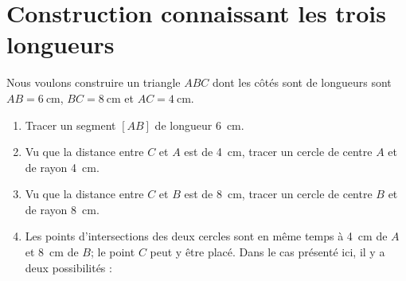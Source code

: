 


\section{Construction connaissant les trois longueurs}

Nous voulons construire un triangle \(ABC\) dont les côtés sont de longueurs sont \( AB=\SI{6}{\centi\meter}\), \( BC=\SI{8}{\centi\meter}\) et \( AC=\SI{4}{\centi\meter}\).


\vspace{2cm}

\begin{enumerate}
    \item
        Tracer un segment \( [AB]\) de longueur \SI{6}{\centi\meter}.
\begin{center}
   
\end{center}
    \item
        Vu que la distance entre \( C\) et \( A\) est de \SI{4}{\centi\meter}, tracer un cercle de centre \( A\) et de rayon \SI{4}{\centi\meter}.
    \item
        Vu que la distance entre  \( C\) et \( B\) est de \SI{8}{\centi\meter}, tracer un cercle de centre \( B\) et de rayon \SI{8}{\centi\meter}.
\begin{center}
   
\end{center}
    \item
        Les points d'intersections des deux cercles sont en même temps à \SI{4}{\centi\meter} de \( A\) et \SI{8}{\centi\meter} de \( B\); le point \( C\) peut y être placé. Dans le cas présenté ici, il y a deux possibilités :

\begin{center}
   
\end{center}

\end{enumerate}

